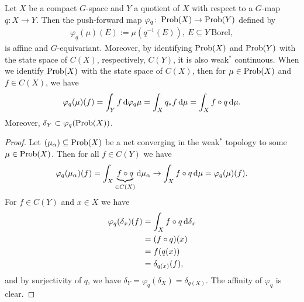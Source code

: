 \begin{lemma}\label{pushforward equiv}
Let $X$ be a compact $G$-space and $Y$ a quotient of $X$ with respect to a $G$-map $q \colon X \to Y$. Then the push-forward map $\varphi_q \colon \operatorname{Prob}(X) \to \operatorname{Prob}(Y)$ defined by 
\begin{align*}
\varphi_q (\mu)(E):=\mu(q^{-1} (E)), \ E \subseteq Y \ \text{Borel},
\end{align*}
is affine and $G$-equivariant. Moreover, by identifying $\operatorname{Prob}(X)$ and $\operatorname{Prob}(Y)$ with the state space of $C(X)$, respectively, $C(Y)$, it is also weak$^*$ continuous. When we identify $\operatorname{Prob}(X)$ with the state space of $C(X)$, then for $\mu \in \operatorname{Prob}(X)$ and $f \in C(X)$, we have
\begin{align*}
\varphi_q (\mu) (f)=\int_{Y} f \mathop{}\!\mathrm{d} \varphi_q \mu =\int_X q_* f \mathop{}\!\mathrm{d} \mu =\int_X f \circ q \mathop{}\!\mathrm{d} \mu .
\end{align*}
Moreover, $\delta_Y \subset \varphi_q(\operatorname{Prob}(X))$.
\begin{proof}
Let $(\mu_{\alpha}) \subseteq \operatorname{Prob}(X)$ be a net converging in the weak$^*$ topology to some $\mu \in \operatorname{Prob}(X)$. Then for all $f \in C(Y)$ we have
\begin{align*}
\varphi_q (\mu_{\alpha})(f) = \int_X \underbrace{f \circ q}_{\in C(X)} \mathop{}\!\mathrm{d} \mu_{\alpha} \to \int_X f \circ q \mathop{}\!\mathrm{d} \mu = \varphi_q (\mu)(f).
\end{align*}
For $f \in C(Y)$ and $x \in X$ we have
\begin{align*}
\varphi_q (\delta_{x})(f)&=\int_X f \circ q \mathop{}\!\mathrm{d} \delta_x\\
&=(f \circ q)(x)\\
&=f(q(x))\\
&= \delta_{q(x)}(f),
\end{align*}
and by surjectivity of $q$, we have $ \delta_{Y} = \varphi_q (\delta_{X}) = \delta_{q(X)}$. The affinity of $\varphi_q$ is clear.
\end{proof}
\end{lemma}

